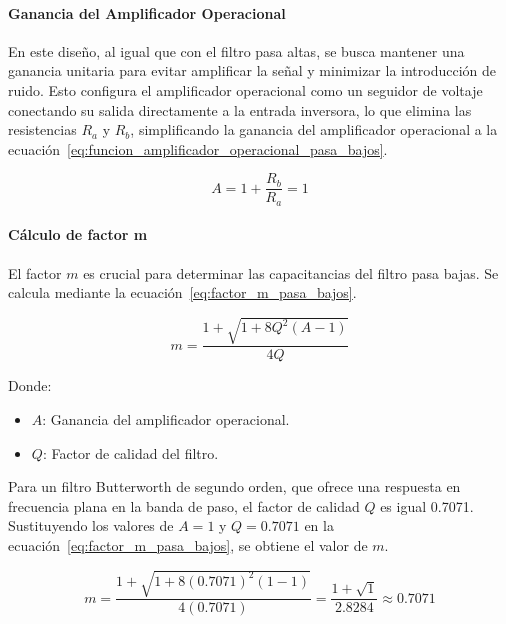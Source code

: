         \paragraph{Ganancia del Amplificador Operacional}
        En este diseño, al igual que con el filtro pasa altas, se busca mantener una ganancia unitaria para evitar amplificar la señal y minimizar la introducción de ruido.
        Esto configura el amplificador operacional como un seguidor de voltaje conectando su salida directamente a la entrada inversora, lo que elimina las resistencias $R_a$ y $R_b$, simplificando la ganancia del amplificador operacional a la ecuación~\ref{eq:funcion_amplificador_operacional_pasa_bajos}.

        \begin{equation}
            \label{eq:funcion_amplificador_operacional_pasa_bajos}
            A = 1 + \frac{R_b}{R_a} = 1
        \end{equation}

        \paragraph{Cálculo de factor m}
        El factor $m$ es crucial para determinar las capacitancias del filtro pasa bajas. Se calcula mediante la ecuación~\ref{eq:factor_m_pasa_bajos}.

        \begin{equation}
            \label{eq:factor_m_pasa_bajos}
            m = \frac{1+\sqrt{1+8Q^2(A-1)}}{4Q}
        \end{equation}

        Donde:

        \begin{itemize}
            \item $A$: Ganancia del amplificador operacional.
            \item $Q$: Factor de calidad del filtro.
        \end{itemize}

        Para un filtro Butterworth de segundo orden, que ofrece una respuesta en frecuencia plana en la banda de paso, el factor de calidad $Q$ es igual 0.7071. Sustituyendo los valores de $A = 1$ y $Q = 0.7071$ en la ecuación~\ref{eq:factor_m_pasa_bajos}, se obtiene el valor de $m$.

        \begin{equation}
            \label{eq:factor_m_pasa_bajos_valor}
            m = \frac{1+\sqrt{1+8(0.7071)^2(1-1)}}{4(0.7071)} = \frac{1 + \sqrt{1}}{2.8284}\approx 0.7071
        \end{equation}

